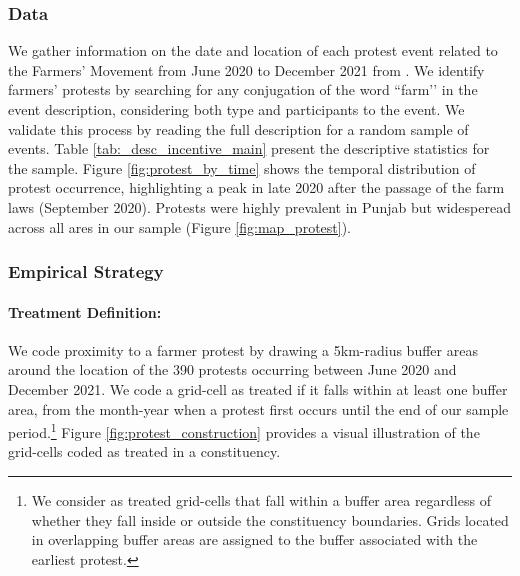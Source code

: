 \documentclass[12pt]{article}
\begin{document}
\subsubsection{Data\label{sssec:data2}}
We gather information on the date and location of each protest event related to the Farmers' Movement from June 2020 to December 2021 from \citet{acled}. We identify farmers' protests by searching for any conjugation of the word  ``farm’’ in the event description, considering both type and participants to the event. We validate this process by reading the full description for a random sample of events.  Table \ref{tab:_desc_incentive_main} present the descriptive statistics for the sample. Figure \ref{fig:protest_by_time} shows the temporal distribution of protest occurrence, highlighting a peak in late 2020 after the passage of the farm laws (September 2020). Protests were highly prevalent in Punjab but widesperead across all ares in our sample (Figure \ref{fig:map_protest}).

\subsubsection{Empirical Strategy\label{sssec:empirical2}}
\paragraph{Treatment Definition:} We code proximity to a farmer protest by drawing a %
5km-radius buffer areas around the location of the 390 protests occurring between June 2020 and December 2021. We code a grid-cell as treated if it falls within at least one buffer area, from the month-year when a protest first occurs until the end of our sample period.\footnote{We consider as treated grid-cells that fall within a buffer area regardless of whether they fall inside or outside the constituency boundaries. Grids located in overlapping buffer areas are assigned to the buffer associated with the earliest protest. } Figure \ref{fig:protest_construction} provides a visual illustration of the grid-cells coded as treated in a constituency. %
\end{document}

